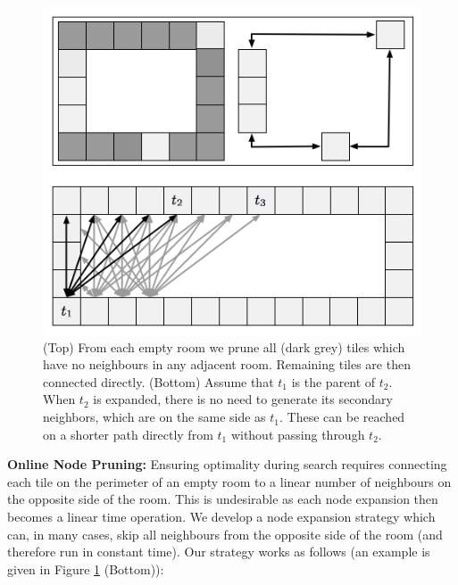 \begin{figure}[t]
	\begin{center}
	\includegraphics[scale=0.5, trim = 10mm 10mm 10mm 0mm]
	{diagrams/branching.png}
	\end{center}
	\vspace{-3pt}
	\caption{(Top) From each empty room we prune all (dark grey) tiles which
	have no neighbours in any adjacent room.
	Remaining tiles are then connected directly.
	(Bottom) Assume that $t_{1}$ is the parent of $t_2$. When $t_2$
	is expanded,
	there is no need to generate its secondary neighbors, which are on the same side
	as $t_1$.  These can be reached on a shorter path directly from $t_1$ without
	passing through $t_2$.
}
\label{fig-branching}
\end{figure}

\textbf{Online Node Pruning:} 
Ensuring optimality during search requires connecting each tile on the perimeter
of an empty room to a linear number of neighbours on the opposite side of the
room.
This is undesirable as each node expansion then becomes a linear time operation. 
We develop a node expansion strategy which can, in many cases, skip all neighbours from 
the opposite side of the room (and therefore run in constant time).
Our strategy works as follows (an example is given in Figure \ref{fig-branching}
(Bottom)):

